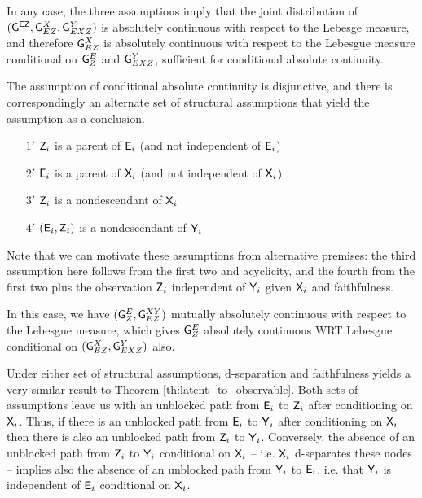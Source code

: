 In any case, the three assumptions imply that the joint distribution of $(\mathsf{G}^{\mathsf{EZ}}, \mathsf{G}^{X}_{EZ}, \mathsf{G}^Y_{EXZ})$ is absolutely continuous with respect to the Lebesge measure, and therefore $\mathsf{G}^X_{EZ}$ is absolutely continuous with respect to the Lebesgue measure conditional on $\mathsf{G}^E_Z$ and $\mathsf{G}^Y_{EXZ}$, sufficient for conditional absolute continuity.

The assumption of conditional absolute continuity is disjunctive, and there is correspondingly an alternate set of structural assumptions that yield the assumption as a conclusion.

\begin{itemize}
    \item[$1'$] $\mathsf{Z}_i$ is a parent of $\mathsf{E}_i$ (and not independent of $\mathsf{E}_i$)
    \item[$2'$] $\mathsf{E}_i$ is a parent of $\mathsf{X}_i$ (and not independent of $\mathsf{X}_i$)
    \item[$3'$] $\mathsf{Z}_i$ is a nondescendant of $\mathsf{X}_i$
    \item[$4'$] $(\mathsf{E}_i, \mathsf{Z}_i)$ is a nondescendant of $\mathsf{Y}_i$
\end{itemize}

Note that we can motivate these assumptions from alternative premises: the third assumption here follows from the first two and acyclicity, and the fourth from the first two plus the observation $\mathsf{Z}_i$ independent of $\mathsf{Y}_i$ given $\mathsf{X}_i$ and faithfulness. 

In this case, we have $(\mathsf{G}^E_Z, \mathsf{G}^{XY}_{EZ})$ mutually absolutely continuous with respect to the Lebesgue measure, which gives $\mathsf{G}^E_Z$ absolutely continuous WRT Lebesgue conditional on $(\mathsf{G}^X_{EZ}, \mathsf{G}^Y_{EXZ})$ also.

Under either set of structural assumptions, d-separation and faithfulness yields a very similar result to Theorem \ref{th:latent_to_observable}. Both sets of assumptions leave us with an unblocked path from $\mathsf{E}_i$ to $\mathsf{Z}_i$ after conditioning on $\mathsf{X}_i$. Thus, if there is an unblocked path from $\mathsf{E}_i$ to $\mathsf{Y}_i$ after conditioning on $\mathsf{X}_i$ then there is also an unblocked path from $\mathsf{Z}_i$ to $\mathsf{Y}_i$. Conversely, the absence of an unblocked path from $\mathsf{Z}_i$ to $\mathsf{Y}_i$ conditional on $\mathsf{X}_i$ -- i.e. $\mathsf{X}_i$ d-separates these nodes -- implies also the absence of an unblocked path from $\mathsf{Y}_i$ to $\mathsf{E}_i$, i.e. that $\mathsf{Y}_i$ is independent of $\mathsf{E}_i$ conditional on $\mathsf{X}_i$.


